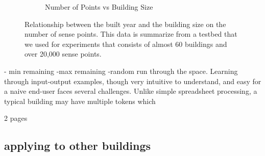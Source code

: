 \begin{figure}[ht]
\begin{subfigure}{0.48\textwidth}
                \caption{Number of Points vs Building Size}
                \label{fig:sense_pts_data_bs}
	\end{subfigure}
\caption{Relationship between the built year and the building size on the number of sense
points.  This data is summarize from a testbed that we used for experiments that consists of
almost 60 buildings and over 20,000 sense points.}
\label{fig:sense_pts_data}
\end{figure}

- min remaining
-max remaining 
-random run through the space.
Learning through input-output examples, though very intuitive to understand, and easy for a naive end-user faces several challenges. Unlike simple spreadsheet processing, a typical building may have multiple tokens  which 



2 pages




\subsection{applying to other buildings}







